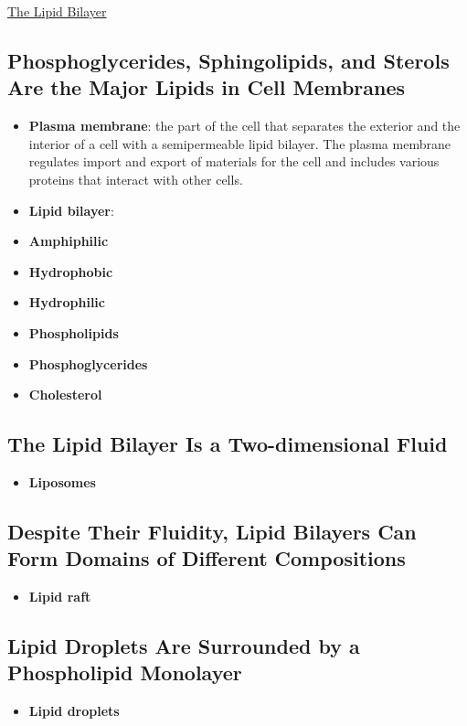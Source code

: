\documentclass[12pt,letterpaper]{article}
\begin{document}
\hypertarget{10.1}{}
\begin{secbox}{\hyperlink{10}{The Lipid Bilayer}}{
    \subsection*{Phosphoglycerides, Sphingolipids, and Sterols Are the Major
    Lipids in Cell Membranes}
    \begin{itemize}
        \item \textbf{Plasma membrane}: the part of the cell that separates the exterior and the interior of a cell with a semipermeable lipid bilayer. The plasma membrane regulates import and export of materials for the cell and includes various proteins that interact with other cells. 
        \item \textbf{Lipid bilayer}: 
        \item \textbf{Amphiphilic}
        \item \textbf{Hydrophobic}
        \item \textbf{Hydrophilic}
        \item \textbf{Phospholipids}
        \item \textbf{Phosphoglycerides}
        \item \textbf{Cholesterol}
    \end{itemize}

    \subsection*{The Lipid Bilayer Is a Two-dimensional Fluid}
    \begin{itemize}   
        \item \textbf{Liposomes} 
    \end{itemize} 

    \subsection*{Despite Their Fluidity, Lipid Bilayers Can Form Domains of Different Compositions}
    \begin{itemize}
        \item \textbf{Lipid raft}
    \end{itemize}

    \subsection*{Lipid Droplets Are Surrounded by a Phospholipid Monolayer}
    \begin{itemize}
        \item \textbf{Lipid droplets}
    \end{itemize}

}
\end{secbox}
\end{document}
